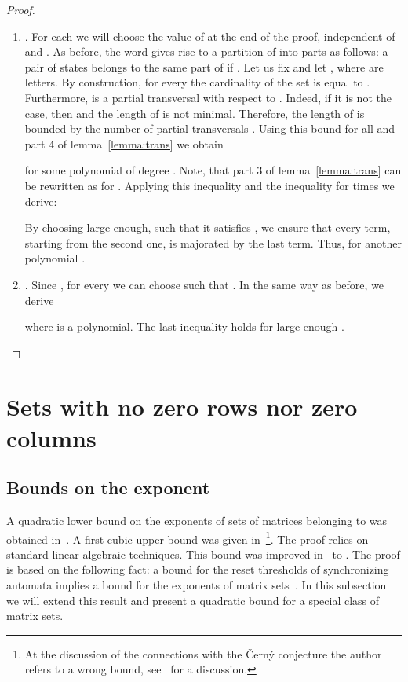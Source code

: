 \documentclass[a4paper,USenglish]{lipics}
\theoremstyle{definition}
\begin{document}
\begin{proof}
\begin{enumerate}
\item . For each  we will choose the value of  at the end of the proof, independent of  and . As before, the word  gives rise to a partition  of  into  parts as follows: a pair of states  belongs to the same part of  if . 
Let us fix  and let , where  are letters. By construction, for every  the cardinality of the set  is equal to . Furthermore,  is a partial transversal with respect to . 
Indeed, if it is not the case, then  and the length of  is not minimal. 
Therefore, the length of  is bounded by the number of partial transversals . 
Using this bound for all  and part 4 of lemma~\ref{lemma:trans} we obtain

for some polynomial  of degree .
Note, that part 3 of lemma~\ref{lemma:trans} can be rewritten as  for . Applying this inequality and the inequality for   times we derive:

By choosing  large enough, such that it satisfies , we ensure that 
every term, starting from the second one, is majorated by the last term. Thus, 
for another polynomial .

\item . 
Since , for every  we can choose  such that . In the same way as before, we derive

where  is a polynomial. The last inequality holds for large enough .
\end{enumerate}
\end{proof}







\section{Sets with no zero rows nor zero columns}

\subsection{Bounds on the exponent}
A quadratic lower bound on the exponents of sets of matrices belonging to  was obtained in~\cite[Corollary 20]{BJO15}.
A first cubic upper bound  was given in~\cite[Theorem 1]{Voy13}\footnote{At the discussion of the connections with the \v{C}ern\'{y} conjecture the author refers to a wrong bound, see~\cite{GoJuTr15} for a discussion.}. The proof relies on standard linear algebraic techniques. This bound was improved in~\cite[Corollary 18]{BJO15} to . The proof is based on the following fact:
a bound  for the reset thresholds of synchronizing automata implies a bound  for the exponents of  matrix sets~\cite[Theorem 17]{BJO15}. In this subsection we will extend this result and present a quadratic bound for a special class of  matrix sets.
\end{document}
